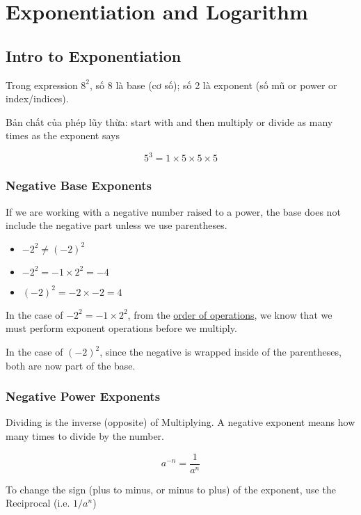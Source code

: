 \chapter{Exponentiation and Logarithm}

\section{Intro to Exponentiation}

Trong expression \(8^{2}\), số 8 là base (cơ số); số 2 là exponent (số mũ or power or index/indices).

Bản chất của phép lũy thừa: start with  and then multiply or divide as many times as the exponent says

\[5^{3}= 1 \times 5 \times 5 \times 5\]

\subsection{Negative Base Exponents}

If we are working with a negative number raised to a power, the base does not include the negative part unless we use parentheses.

\begin{itemize}
  \item \(-2^{2} \neq (-2)^{2}\)
  \item \(-2^{2}=-1 \times 2^{2}=-4\)
  \item \((-2)^{2} = -2 \times -2 = 4\)
\end{itemize}

In the case of \(-2^{2} = -1 \times 2^{2}\), from the \href{https://greenemath.com/Prealgebra/16/OrderofOperationsLesson.html}{order of operations}, we know that we must perform exponent operations before we multiply.

In the case of \((-2)^{2}\), since the negative is wrapped inside of the parentheses, both are now part of the base.

\subsection{Negative Power Exponents}

Dividing is the inverse (opposite) of Multiplying. A negative exponent means how many times to divide by the number.

\[a^{-n} = \frac{1}{a^{n}}\]

To change the sign (plus to minus, or minus to plus) of the exponent, use the Reciprocal (i.e. \(1/a^{n}\))

